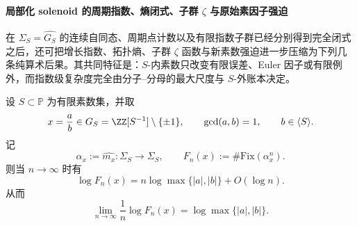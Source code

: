 \paragraph{局部化 solenoid 的周期指数、熵闭式、子群 \texorpdfstring{$\zeta$}{zeta} 与原始素因子强迫}
在 \(\Sigma_S=\widehat{G_S}\) 的连续自同态、周期点计数以及有限指数子群已经分别得到完全闭式之后，还可把增长指数、拓扑熵、子群 \(\zeta\) 函数与新素数强迫进一步压缩为下列几条纯算术后果。其共同特征是：\(S\)-内素数只改变有限误差、Euler 因子或有限例外，而指数级复杂度完全由分子--分母的最大尺度与 \(S\)-外账本决定。

\begin{theorem}\label{thm:xi-localized-solenoid-periodic-growth-max-scale}
设 \(S\subset\mathbb P\) 为有限素数集，并取
\[
x=\frac{a}{b}\in G_S=\ZZ[S^{-1}]\setminus\{\pm1\},
\qquad
\gcd(a,b)=1,
\qquad
b\in\langle S\rangle.
\]
记
\[
\alpha_x:=\widehat{m_x}:\Sigma_S\to\Sigma_S,
\qquad
F_n(x):=\#\mathrm{Fix}(\alpha_x^n).
\]
则当 \(n\to\infty\) 时有
\[
\boxed{\;
\log F_n(x)
=
n\log \max\{|a|,|b|\}+O(\log n).\;}
\]
从而
\[
\boxed{\;
\lim_{n\to\infty}\frac{1}{n}\log F_n(x)
=
\log \max\{|a|,|b|\}.\;}
\]
\end{theorem}
